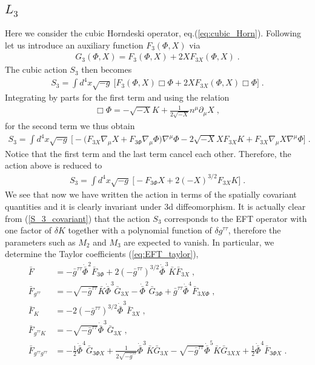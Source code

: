 \documentclass[a4paper,11pt]{article}
\numberwithin{equation}{section}
\begin{document}
\subsection{$L_3$}
Here we consider the cubic Horndeski operator, eq.(\ref{eq:cubic_Horn}). Following \cite{Gleyzes:2013ooa} let us introduce an auxiliary function $F_3(\Phi,X)$ via
\begin{align}
G_3(\Phi,X) = F_3(\Phi,X) + 2 X F_{3X}(\Phi,X) \;. 
\end{align}
The cubic action $S_3$ then becomes
\begin{align}
S_3 = \int d^4x \sqrt{-g}~\bigg[ F_3(\Phi,X) \Box \Phi  + 2 X F_{3X}(\Phi,X) \Box \Phi  \bigg]\;.
\end{align}
Integrating by parts for the first term and using the relation 
\begin{align}\label{eq:box_phi}
\Box \Phi = -\sqrt{-X} K + \frac{1}{2 \sqrt{-X}} n^\mu \partial_\mu X \;,
\end{align}
for the second term we thus obtain
\begin{align}
S_3 = \int d^4x \sqrt{-g}~\bigg[ -\bigg( F_{3X} \nabla_\mu X + F_{3\Phi} \nabla_\mu\Phi \bigg) \nabla^\mu \Phi  - 2 \sqrt{-X} X F_{3X} K + F_{3X} \nabla_\mu X \nabla^\mu\Phi  \bigg] \;.
\end{align}
Notice that the first term and the last term cancel each other.  Therefore, the action above is reduced to
\begin{align}\label{S_3_covariant}
S_3 = \int d^4x \sqrt{-g}~\bigg[ - F_{3\Phi} X + 2 (-X)^{3/2} F_{3X} K  \bigg] \;.
\end{align}
We see that now we have written the action in terms of the spatially covariant quantities and it is clearly invariant under 3d diffeomorphism. It is actually clear from (\ref{S_3_covariant}) that the action $S_3$ corresponds to the EFT operator with one factor of $\delta K$ together with a polynomial function of $\delta g^{\tau\tau}$, therefore the parameters such as $M_2$ and $M_3$ are expected to vanish. In particular, we determine the Taylor coefficients (\ref{eq:EFT_taylor}),
\begin{align}
\bar{F} &= -\bar{g}^{\tau\tau}\dot{\bar{\Phi}}^2 \bar{F}_{3 \Phi} + 2 (-\bar{g}^{\tau\tau})^{3/2} \dot{\bar{\Phi}}^3 \bar{K} \bar{F}_{3 X} \;, \label{L3_1} \\
\bar{F}_{g^{\tau\tau}} &=  -\sqrt{-\bar{g}^{\tau\tau}} \bar{K} \dot{\bar{\Phi}}^3 \bar{G}_{3X} - \dot{\bar{\Phi}}^2 \bar{G}_{3\Phi} + \bar{g}^{\tau\tau}\dot{\bar{\Phi}}^4 \bar{F}_{3X\Phi}  \label{L3_2} \;, \\
\bar{F}_K &= - 2 (-\bar{g}^{\tau\tau})^{3/2} \dot{\bar{\Phi}}^3 \bar{F}_{3X}  \;, \\
\bar{F}_{g^{\tau\tau}K} &= -\sqrt{-\bar{g}^{\tau\tau}} \dot{\bar{\Phi}}^3 \bar{G}_{3X}  \;, \\
\bar{F}_{g^{\tau\tau}g^{\tau\tau}} &= -\frac{1}{2} \dot{\bar{\Phi}}^4 \bar{G}_{3 \Phi X} + \frac{1}{2\sqrt{-\bar{g}^{\tau\tau}}}  \dot{\bar{\Phi}}^3 \bar{K} \bar{G}_{3 X} - \sqrt{-\bar{g}^{\tau\tau}} \dot{\bar{\Phi}}^5 \bar{K} \bar{G}_{3XX} + \frac{1}{2} \dot{\bar{\Phi}}^4 \bar{F}_{3\Phi X}  \;.
\end{align}
\end{document}

